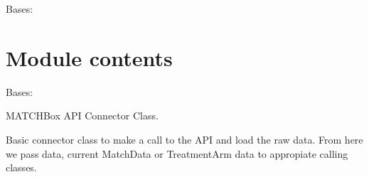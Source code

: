 \documentclass[letterpaper,10pt,english]{sphinxmanual}
\begin{document}
\begin{fulllineitems}
\label{\detokenize{matchbox_api_utils:matchbox_api_utils.matchbox_conf.Config}}
Bases: 

\begin{fulllineitems}
\label{\detokenize{matchbox_api_utils:matchbox_api_utils.matchbox_conf.Config.read_config}}
\end{fulllineitems}


\end{fulllineitems}



\section{Module contents}
\label{\detokenize{matchbox_api_utils:module-contents}}\label{\detokenize{matchbox_api_utils:module-matchbox_api_utils}}

\begin{fulllineitems}
\label{\detokenize{matchbox_api_utils:matchbox_api_utils.Matchbox}}
Bases: 

MATCHBox API Connector Class.

Basic connector class to make a call to the API and load the raw data. From
here we pass data, current MatchData or TreatmentArm data to appropiate calling
classes.

\end{fulllineitems}

\end{document}
